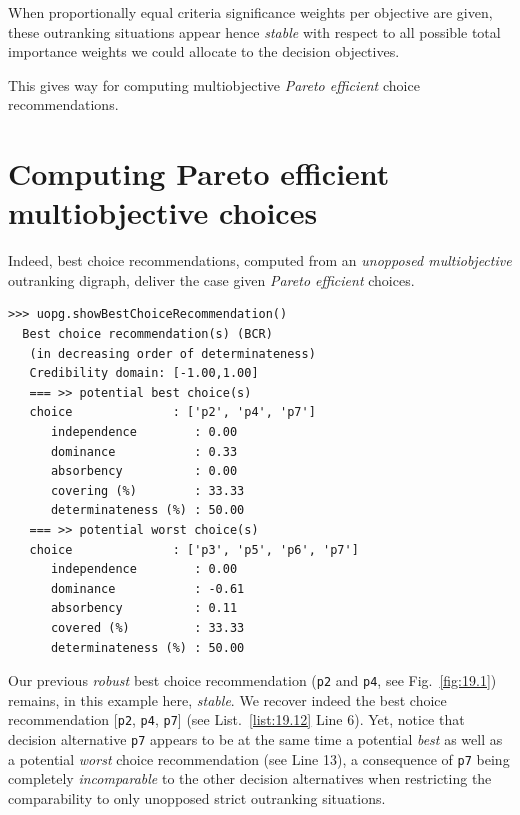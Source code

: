 When proportionally equal criteria significance weights per objective are given, these outranking situations appear hence \emph{stable} with respect to all possible total importance weights we could allocate to the decision objectives.

This gives way for computing multiobjective \emph{Pareto efficient} choice recommendations. 

\section{Computing Pareto efficient multiobjective choices}
\label{sec:19.6}

Indeed, best choice recommendations, computed from an \emph{unopposed multiobjective} outranking digraph, deliver the case given \emph{Pareto efficient} choices. 
\begin{lstlisting}[caption={Pareto efficient multiobjective choice},label=list:19.12]
>>> uopg.showBestChoiceRecommendation()
  Best choice recommendation(s) (BCR)
   (in decreasing order of determinateness)   
   Credibility domain: [-1.00,1.00]
   === >> potential best choice(s)
   choice              : ['p2', 'p4', 'p7']
      independence        : 0.00
      dominance           : 0.33
      absorbency          : 0.00
      covering (%)        : 33.33
      determinateness (%) : 50.00
   === >> potential worst choice(s) 
   choice              : ['p3', 'p5', 'p6', 'p7']
      independence        : 0.00
      dominance           : -0.61
      absorbency          : 0.11
      covered (%)         : 33.33
      determinateness (%) : 50.00
\end{lstlisting}

Our previous \emph{robust} best choice recommendation (\texttt{p2} and \texttt{p4}, see Fig.~\vref{fig:19.1}) remains, in this example here, \emph{stable}. We recover indeed the best choice recommendation [\texttt{p2}, \texttt{p4}, \texttt{p7}] (see List.~\vref{list:19.12} Line 6). Yet, notice that decision alternative \texttt{p7} appears to be at the same time a potential \emph{best} as well as a potential \emph{worst} choice recommendation (see Line 13), a consequence of \texttt{p7} being completely \emph{incomparable} to the other decision alternatives when restricting the comparability to only unopposed strict outranking situations. 

